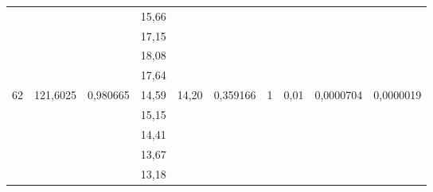 \documentclass[a4paper, 12pt]{article}
\begin{document}
\begin{table}[h!]
\begin{tabular}{|c|c|c|c|c|c|c|c|c|c|}
                    &                           &                           & 15,66 &                                &                                   &                    &                       &                            &                              \\ \cline{4-4}
                    &                           &                           & 17,15 &                                &                                   &                    &                       &                            &                              \\ \cline{4-4}
                    &                           &                           & 18,08 &                                &                                   &                    &                       &                            &                              \\ \cline{4-4}
                    &                           &                           & 17,64 &                                &                                   &                    &                       &                            &                              \\ \hline
\multirow{5}{*}{62} & \multirow{5}{*}{121,6025} & \multirow{5}{*}{0,980665} & 14,59 & \multirow{5}{*}{14,20}         & \multirow{5}{*}{0,359166}         & \multirow{5}{*}{1} & \multirow{5}{*}{0,01} & \multirow{5}{*}{0,0000704} & \multirow{5}{*}{0,0000019}   \\ \cline{4-4}
                    &                           &                           & 15,15 &                                &                                   &                    &                       &                            &                              \\ \cline{4-4}
                    &                           &                           & 14,41 &                                &                                   &                    &                       &                            &                              \\ \cline{4-4}
                    &                           &                           & 13,67 &                                &                                   &                    &                       &                            &                              \\ \cline{4-4}
                    &                           &                           & 13,18 &                                &                                   &                    &                       &                            &                              \\ \hline

\end{tabular}
\end{table}
\end{document}
